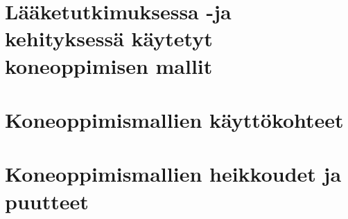 \documentclass[finnish,twoside,censored,essay,sw-line]{HYthesisML}
\begin{document}
\chapter{Lääketutkimuksessa -ja kehityksessä käytetyt koneoppimisen mallit}

\chapter{Koneoppimismallien käyttökohteet}

\chapter{Koneoppimismallien heikkoudet ja puutteet}

\cleardoublepage
{}
{}
\printbibliography

\backmatter
\end{document}
